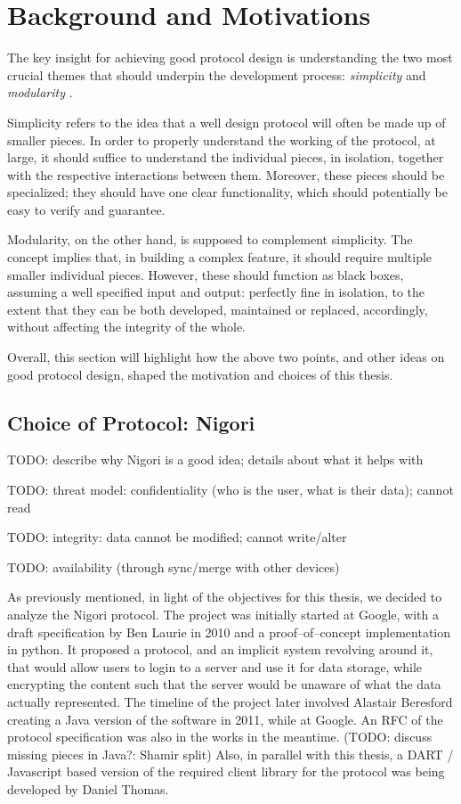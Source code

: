 \chapter{Background and Motivations} \label{chapter:background}
The key insight for achieving good protocol design is understanding the two most crucial themes that should underpin the development process: \textit{simplicity} and \textit{modularity} \cite{ProtocolDesign}.

Simplicity refers to the idea that a well design protocol will often be made up of smaller pieces. In order to properly understand the working of the protocol, at large, it should suffice to understand the individual pieces, in isolation, together with the respective interactions between them. Moreover, these pieces should be specialized; they should have one clear functionality, which should potentially be easy to verify and guarantee.

Modularity, on the other hand, is supposed to complement simplicity. The concept implies that, in building a complex feature, it should require multiple smaller individual pieces. However, these should function as black boxes, assuming a well specified input and output: perfectly fine in isolation, to the extent that they can be both developed, maintained or replaced, accordingly, without affecting the integrity of the whole.

Overall, this section will highlight how the above two points, and other ideas on good protocol design, shaped the motivation and choices of this thesis.

\section{Choice of Protocol: Nigori}
TODO: describe why Nigori is a good idea; details about what it helps with

TODO: threat model: confidentiality (who is the user, what is their data); cannot read

TODO: integrity: data cannot be modified; cannot write/alter

TODO: availability (through sync/merge with other devices)

As previously mentioned, in light of the objectives for this thesis, we decided to analyze the Nigori protocol.
The project was initially started at Google, with a draft specification by Ben Laurie in 2010 \cite{NigoriDraft} and a proof--of--concept implementation in python.
It proposed a protocol, and an implicit system revolving around it, that would allow users to login to a server and use it for data storage, while encrypting the content such that the server would be unaware of what the data actually represented.
The timeline of the project later involved Alastair Beresford creating a Java version of the software in 2011, while at Google.
An RFC \cite{NigoriRFC} of the protocol specification was also in the works in the meantime. (TODO: discuss missing pieces in Java?: Shamir split)
Also, in parallel with this thesis, a DART \cite{DART} / Javascript based version of the required client library for the protocol was being developed by Daniel Thomas.

